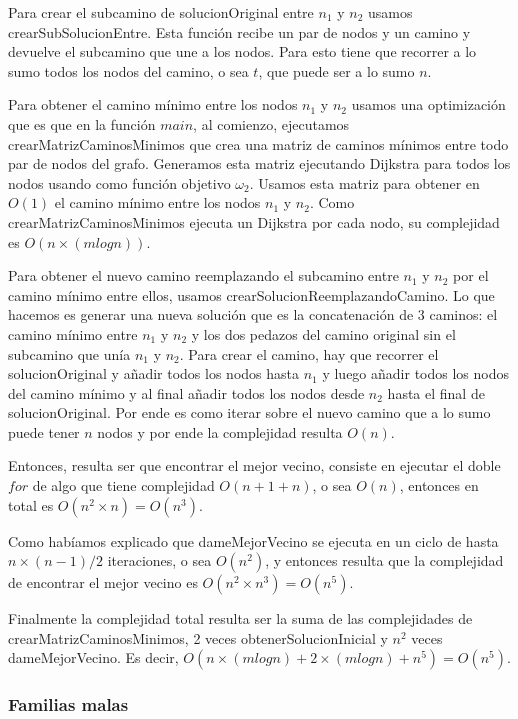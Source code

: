 Para crear el subcamino de solucionOriginal entre $n_1$ y $n_2$ usamos crearSubSolucionEntre. Esta función recibe un par de nodos y un camino y devuelve el subcamino que une a los nodos. Para esto tiene que recorrer a lo sumo todos los nodos del camino, o sea $t$, que puede ser a lo sumo $n$.

Para obtener el camino mínimo entre los nodos $n_1$ y $n_2$ usamos una optimización que es que en la función $main$, al comienzo, ejecutamos crearMatrizCaminosMinimos que crea una matriz de caminos mínimos entre todo par de nodos del grafo. Generamos esta matriz ejecutando Dijkstra para todos los nodos usando como función objetivo $\omega_2$. Usamos esta matriz para obtener en $O(1)$ el camino mínimo entre los nodos $n_1$ y $n_2$.
Como crearMatrizCaminosMinimos ejecuta un Dijkstra por cada nodo, su complejidad es $O(n \times (m log n))$.

Para obtener el nuevo camino reemplazando el subcamino entre $n_1$ y $n_2$ por el camino mínimo entre ellos, usamos crearSolucionReemplazandoCamino.
Lo que hacemos es generar una nueva solución que es la concatenación de 3 caminos: el camino mínimo entre $n_1$ y $n_2$ y los dos pedazos del camino original sin el subcamino que unía $n_1$ y $n_2$. Para crear el camino, hay que recorrer el solucionOriginal y añadir todos los nodos hasta $n_1$ y luego añadir todos los nodos del camino mínimo y al final añadir todos los nodos desde $n_2$ hasta el final de solucionOriginal. Por ende es como iterar sobre el nuevo camino que a lo sumo puede tener $n$ nodos y por ende la complejidad resulta $O(n)$.

Entonces, resulta ser que encontrar el mejor vecino, consiste en ejecutar el doble $for$ de algo que tiene complejidad $O(n + 1 + n)$, o sea $O(n)$, entonces en total es $O(n^2 \times n) = O(n^3)$.

Como habíamos explicado que dameMejorVecino se ejecuta en un ciclo de hasta $n \times (n-1) / 2$ iteraciones, o sea $O(n^2)$, y entonces resulta que la complejidad de encontrar el mejor vecino es $O(n^2 \times n^3) = O(n^5)$. 

Finalmente la complejidad total resulta ser la suma de las complejidades de crearMatrizCaminosMinimos, 2 veces obtenerSolucionInicial y $n^2$ veces dameMejorVecino. Es decir, $O(n \times (m log n) + 2 \times (m log n) + n^5) = O(n^5)$.

\subsubsection{Familias malas}

